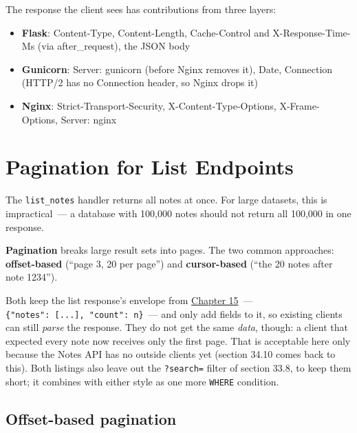 \noindent{}The response the client sees has contributions from three layers:

\begin{itemize}
\tightlist
\item
  \textbf{Flask}: Content-Type, Content-Length, Cache-Control and X-Response-Time-Ms (via after\_request), the JSON body
\item
  \textbf{Gunicorn}: Server: gunicorn (before Nginx removes it), Date, Connection (HTTP/2 has no Connection header, so Nginx drops it)
\item
  \textbf{Nginx}: Strict-Transport-Security, X-Content-Type-Options, X-Frame-Options, Server: nginx
\end{itemize}

\setcounter{section}{8}
\section{Pagination for List Endpoints}\label{34-response-handling:349-pagination-for-list-endpoints}

The \texttt{list\_notes} handler returns all notes at once. For large datasets, this is impractical~--- a database with 100,000 notes should not return all 100,000 in one response.

\textbf{Pagination} breaks large result sets into pages. The two common approaches: \textbf{offset-based} (``page 3, 20 per page'') and \textbf{cursor-based} (``the 20 notes after note 1234'').

Both keep the list response's envelope from \hyperref[ch:15-structuring-the-application]{Chapter 15}~--- \texttt{\{"notes":}\allowbreak{}\texttt{\ {[}.}\allowbreak{}\texttt{.}\allowbreak{}\texttt{.}\allowbreak{}\texttt{{]},}\allowbreak{}\texttt{\ "count":}\allowbreak{}\texttt{\ n\}}~--- and only add fields to it, so existing clients can still \emph{parse} the response. They do not get the same \emph{data}, though: a client that expected every note now receives only the first page. That is acceptable here only because the Notes API has no outside clients yet (section 34.10 comes back to this). Both listings also leave out the \texttt{?search=} filter of section 33.8, to keep them short; it combines with either style as one more \texttt{WHERE} condition.

\subsection*{Offset-based pagination}\label{34-response-handling:offset-based-pagination}

